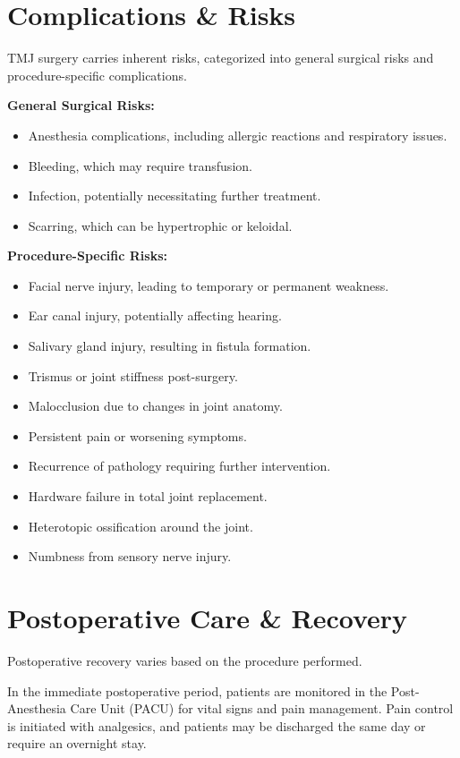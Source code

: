 \section*{Complications \& Risks}
TMJ surgery carries inherent risks, categorized into general surgical risks and procedure-specific complications.

\textbf{General Surgical Risks:}
\begin{itemize}
  \item Anesthesia complications, including allergic reactions and respiratory issues.
  \item Bleeding, which may require transfusion.
  \item Infection, potentially necessitating further treatment.
  \item Scarring, which can be hypertrophic or keloidal.
\end{itemize}

\textbf{Procedure-Specific Risks:}
\begin{itemize}
  \item Facial nerve injury, leading to temporary or permanent weakness.
  \item Ear canal injury, potentially affecting hearing.
  \item Salivary gland injury, resulting in fistula formation.
  \item Trismus or joint stiffness post-surgery.
  \item Malocclusion due to changes in joint anatomy.
  \item Persistent pain or worsening symptoms.
  \item Recurrence of pathology requiring further intervention.
  \item Hardware failure in total joint replacement.
  \item Heterotopic ossification around the joint.
  \item Numbness from sensory nerve injury.
\end{itemize}

\section*{Postoperative Care \& Recovery}
Postoperative recovery varies based on the procedure performed. 

In the immediate postoperative period, patients are monitored in the Post-Anesthesia Care Unit (PACU) for vital signs and pain management. Pain control is initiated with analgesics, and patients may be discharged the same day or require an overnight stay.

